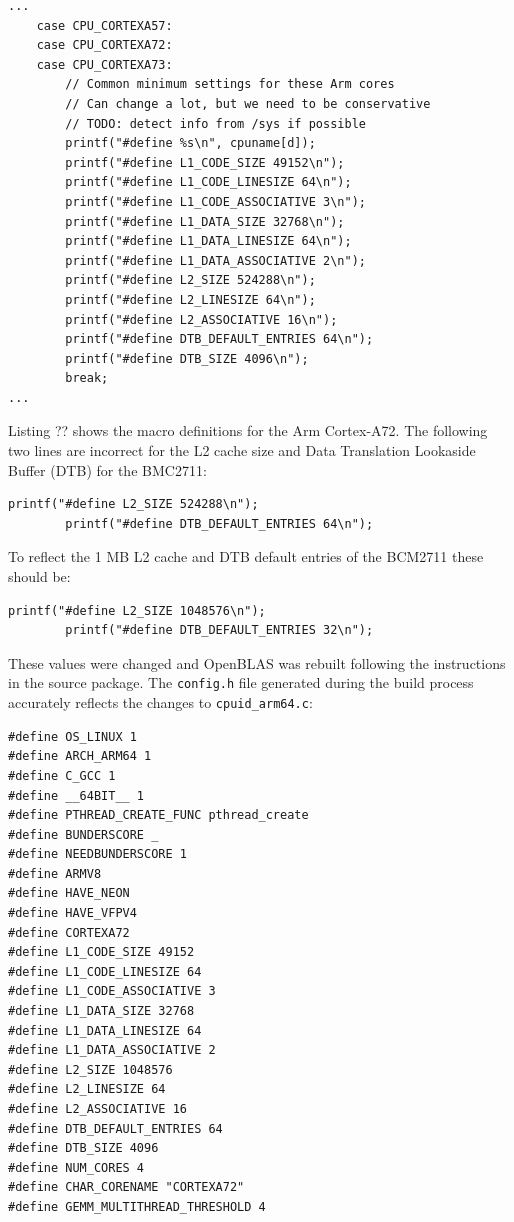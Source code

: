 \documentclass{report}
\begin{document}
\lstset{style=listing}
\begin{lstlisting}[caption=cpuid\_arm64.c, numbers=none]
...
	case CPU_CORTEXA57:
	case CPU_CORTEXA72:
	case CPU_CORTEXA73:
		// Common minimum settings for these Arm cores
		// Can change a lot, but we need to be conservative
		// TODO: detect info from /sys if possible
		printf("#define %s\n", cpuname[d]);
		printf("#define L1_CODE_SIZE 49152\n");
		printf("#define L1_CODE_LINESIZE 64\n");
		printf("#define L1_CODE_ASSOCIATIVE 3\n");
		printf("#define L1_DATA_SIZE 32768\n");
		printf("#define L1_DATA_LINESIZE 64\n");
		printf("#define L1_DATA_ASSOCIATIVE 2\n");
		printf("#define L2_SIZE 524288\n");
		printf("#define L2_LINESIZE 64\n");
		printf("#define L2_ASSOCIATIVE 16\n");
		printf("#define DTB_DEFAULT_ENTRIES 64\n");
		printf("#define DTB_SIZE 4096\n");
		break;
...
\end{lstlisting}

Listing ?? shows the macro definitions for the Arm Cortex-A72. The following two lines are incorrect for the L2 cache size and Data Translation Lookaside Buffer (DTB) for the BMC2711:

\lstset{style=listing}
\begin{lstlisting}[numbers=none]
		printf("#define L2_SIZE 524288\n");
		printf("#define DTB_DEFAULT_ENTRIES 64\n");
\end{lstlisting}

To reflect the 1 MB L2 cache and DTB default entries of the BCM2711 these should be:

\lstset{style=listing}
\begin{lstlisting}[numbers=none]
		printf("#define L2_SIZE 1048576\n");
		printf("#define DTB_DEFAULT_ENTRIES 32\n");
\end{lstlisting}

These values were changed and OpenBLAS was rebuilt following the instructions in the source package. The \verb|config.h| file generated during the build process accurately reflects the changes to \verb|cpuid_arm64.c|:

\lstset{style=listing}
\begin{lstlisting}[caption=config.h]
#define OS_LINUX 1
#define ARCH_ARM64 1
#define C_GCC 1
#define __64BIT__ 1
#define PTHREAD_CREATE_FUNC pthread_create
#define BUNDERSCORE _
#define NEEDBUNDERSCORE 1
#define ARMV8
#define HAVE_NEON
#define HAVE_VFPV4
#define CORTEXA72
#define L1_CODE_SIZE 49152
#define L1_CODE_LINESIZE 64
#define L1_CODE_ASSOCIATIVE 3
#define L1_DATA_SIZE 32768
#define L1_DATA_LINESIZE 64
#define L1_DATA_ASSOCIATIVE 2
#define L2_SIZE 1048576
#define L2_LINESIZE 64
#define L2_ASSOCIATIVE 16
#define DTB_DEFAULT_ENTRIES 64
#define DTB_SIZE 4096
#define NUM_CORES 4
#define CHAR_CORENAME "CORTEXA72"
#define GEMM_MULTITHREAD_THRESHOLD 4
\end{lstlisting}
\end{document}
